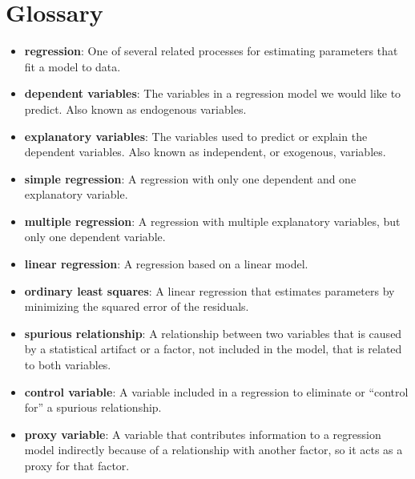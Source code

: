 \documentclass[12pt]{book}
\begin{document}
\section{Glossary}

\begin{itemize}

\item {\bf regression}: One of several related processes for estimating parameters
that fit a model to data.

\item {\bf dependent variables}: The variables in a regression model we would
like to predict.  Also known as endogenous variables.

\item {\bf explanatory variables}: The variables used to predict or explain
the dependent variables.  Also known as independent, or exogenous,
variables.

\item {\bf simple regression}: A regression with only one dependent and
one explanatory variable.

\item {\bf multiple regression}: A regression with multiple explanatory
variables, but only one dependent variable.

\item {\bf linear regression}: A regression based on a linear model.

\item {\bf ordinary least squares}: A linear regression that estimates
parameters by minimizing the squared error of the residuals.

\item {\bf spurious relationship}: A relationship between two variables that is 
caused by a statistical artifact or a factor, not included in the
model, that is related to both variables.

\item {\bf control variable}: A variable included in a regression to
eliminate or ``control for'' a spurious relationship.

\item {\bf proxy variable}: A variable that contributes information to
a regression model indirectly because of a relationship with another
factor, so it acts as a proxy for that factor.


\end{itemize}
\end{document}
